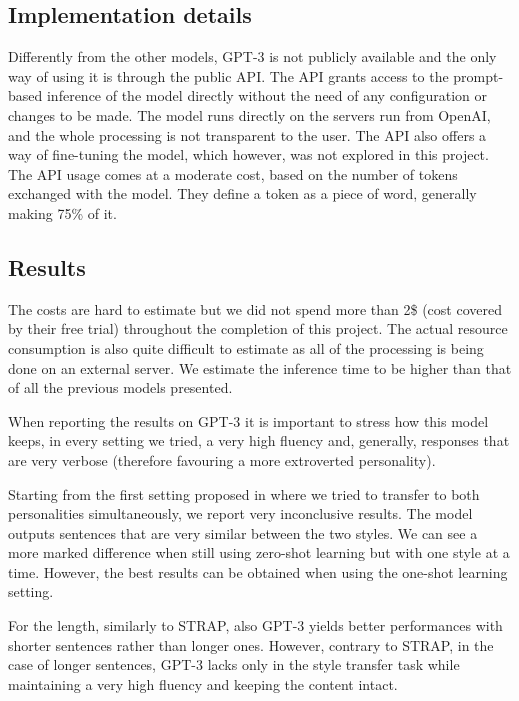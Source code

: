 \documentclass[nomenclature, english, biblatex]{kththesis}
\begin{document}
\subsection{Implementation details}
Differently from the other models, GPT-3 is not publicly available and the only way of using it is through the public API. The API grants access to the prompt-based inference of the model directly without the need of any configuration or changes to be made. The model runs directly on the servers run from OpenAI, and the whole processing is not transparent to the user. The API also offers a way of fine-tuning the model, which however, was not explored in this project. The API usage comes at a moderate cost, based on the number of tokens exchanged with the model. They define a token as a piece of word, generally making 75\% of it.
\subsection{Results}
The costs are hard to estimate but we did not spend more than 2\$ (cost covered by their free trial) throughout the completion of this project. The actual resource consumption is also quite difficult to estimate as all of the processing is being done on an external server. We estimate the inference time to be higher than that of all the previous models presented.

When reporting the results on GPT-3 it is important to stress how this model keeps, in every setting we tried, a very high fluency and, generally, responses that are very verbose (therefore favouring a more extroverted personality). 

Starting from the first setting proposed in  where we tried to transfer to both personalities simultaneously, we report very inconclusive results. The model outputs sentences that are very similar between the two styles. We can see a more marked difference when still using zero-shot learning but with one style at a time. However, the best results can be obtained when using the one-shot learning setting.

For the length, similarly to STRAP, also GPT-3 yields better performances with shorter sentences rather than longer ones. However, contrary to STRAP, in the case of longer sentences, GPT-3 lacks only in the style transfer task while maintaining a very high fluency and keeping the content intact.
\end{document}

